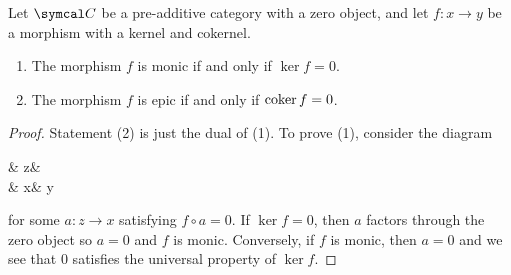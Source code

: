 \begin{proposition}
	Let \(\calC\) be a pre-additive category with a zero object, and let \(f\!:x\to y\) be a morphism with a kernel and cokernel.
	\begin{enumerate}[label=(\arabic*)]
	\item The morphism \(f\) is monic if and only if \(\ker{f} = 0\).
	\item The morphism \(f\) is epic if and only if \(\operatorname{coker}{f} = 0\).
	\end{enumerate}
\end{proposition}
\begin{proof}
Statement (2) is just the dual of (1). To prove (1), consider the diagram
\begin{diagram*}
	& z\ar[d,"a"']\ar[dl,dashed]\ar[dr,"0"] & \\
	 \ar[r,hook] & x\ar[r,"f"] & y
\end{diagram*}
for some \(a\!:z\to x\) satisfying \(f\circ a = 0\). If \(\ker{f}=0\), then \(a\) factors through the zero object so \(a=0\) and \(f\) is monic.
Conversely, if \(f\) is monic, then \(a=0\) and we see that \(0\) satisfies the universal property of \(\ker{f}\).
\end{proof}


